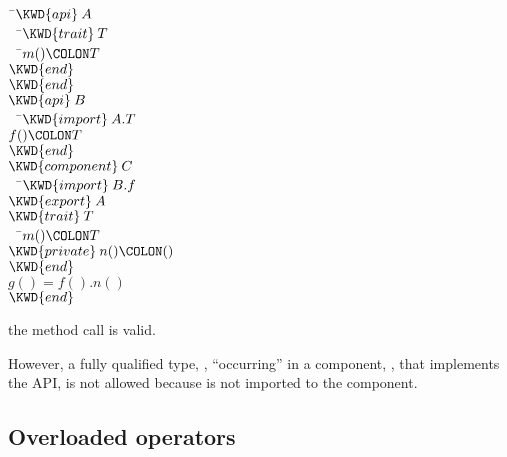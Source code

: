 

\begin{Fortress}
{\tt~}\pushtabs\=\+\( \KWD{api}\:A\)\\
{\tt~~}\pushtabs\=\+\(   \KWD{trait}\:T\)\\
{\tt~~}\pushtabs\=\+\(     m()\COLON T\)\-\\\poptabs
\(   \KWD{end}\)\-\\\poptabs
\( \KWD{end}\)\\[4pt]
\( \KWD{api}\:B\)\\
{\tt~~}\pushtabs\=\+\(   \KWD{import}\:A.T\)\\
\(   f()\COLON T\)\-\\\poptabs
\( \KWD{end}\)\\[4pt]
\( \KWD{component}\:C\)\\
{\tt~~}\pushtabs\=\+\(   \KWD{import}\:B.f\)\\
\(   \KWD{export}\:A\)\\
\(   \KWD{trait}\:T\)\\
{\tt~~}\pushtabs\=\+\(     m()\COLON T\)\\
\(     \KWD{private}\:n()\COLON ()\)\-\\\poptabs
\(   \KWD{end}\)\\
\(   g() = f().n()\)\-\\\poptabs
\( \KWD{end}\)\-\\\poptabs
\end{Fortress}

the method call  is valid.

However, a fully qualified type, ,
``occurring'' in a component, , that implements the API, 
is not allowed because  is not imported to the component.

\subsection{Overloaded operators}

